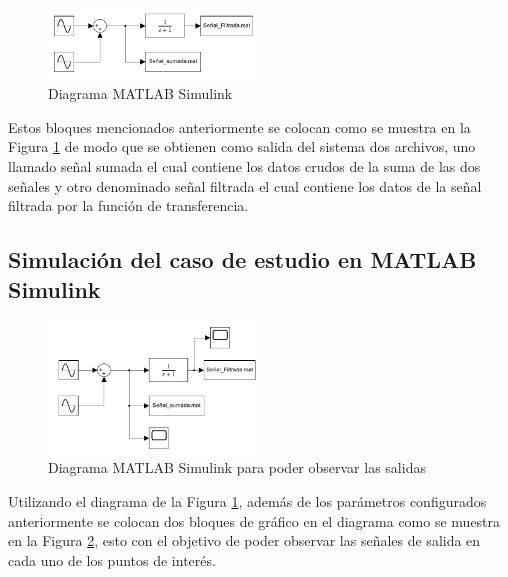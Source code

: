\begin{figure}[h!]
    \centering
    \includegraphics[width=0.5\textwidth]{fig/especifico_2/Diagrama matlab simulink.pdf}
    \caption{Diagrama MATLAB Simulink}
    \label{fig:diagrama_matlab_simulink}
\end{figure}

Estos bloques mencionados anteriormente se colocan como se muestra en la Figura \ref{fig:diagrama_matlab_simulink} de modo que se obtienen como salida del sistema dos archivos, uno llamado señal sumada el cual contiene los datos crudos de la suma de las dos señales y otro denominado señal filtrada el cual contiene los datos de la señal filtrada por la función de transferencia.

\subsection{Simulación del caso de estudio en MATLAB Simulink}\label{subsec:simulacion_caso_de_estudio}

\begin{figure}[h!]
    \centering
    \includegraphics[width=0.5\textwidth]{fig/especifico_2/Diagrama matlab simulink scope.pdf}
    \caption{Diagrama MATLAB Simulink para poder observar las salidas}
    \label{fig:diagrama_matlab_simulink_graficos}
\end{figure}

Utilizando el diagrama de la Figura \ref{fig:diagrama_matlab_simulink}, además de los parámetros configurados anteriormente se colocan dos bloques de gráfico en el diagrama como se muestra en la Figura \ref{fig:diagrama_matlab_simulink_graficos}, esto con el objetivo de poder observar las señales de salida en cada uno de los puntos de interés. 


